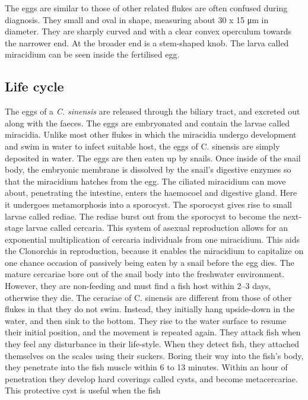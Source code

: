 \documentclass[]{book}
\theoremstyle{definition}
\theoremstyle{definition}
\theoremstyle{definition}
\theoremstyle{remark}
\begin{document}
The eggs are similar to those of other related flukes are often confused
during diagnosis. They small and oval in shape, measuring about 30 x 15
μm in diameter. They are sharply curved and with a clear convex
operculum towards the narrower end. At the broader end is a stem-shaped
knob. The larva called miracidium can be seen inside the fertilised egg.

\subsection{Life cycle}\label{life-cycle-3}

The eggs of a \emph{C. sinensis} are released through the biliary tract,
and excreted out along with the faeces. The eggs are embryonated and
contain the larvae called miracidia. Unlike most other flukes in which
the miracidia undergo development and swim in water to infect suitable
host, the eggs of C. sinensis are simply deposited in water. The eggs
are then eaten up by snails. Once inside of the snail body, the
embryonic membrane is dissolved by the snail's digestive enzymes so that
the miracidium hatches from the egg. The ciliated miracidium can move
about, penetrating the intestine, enters the haemocoel and digestive
gland. Here it undergoes metamorphosis into a sporocyst. The sporocyst
gives rise to small larvae called rediae. The rediae burst out from the
sporocyst to become the next-stage larvae called cercaria. This system
of asexual reproduction allows for an exponential multiplication of
cercaria individuals from one miracidium. This aids the Clonorchis in
reproduction, because it enables the miracidium to capitalize on one
chance occasion of passively being eaten by a snail before the egg dies.
The mature cercariae bore out of the snail body into the freshwater
environment. However, they are non-feeding and must find a fish host
within 2--3 days, otherwise they die. The ceraciae of C. sinensis are
different from those of other flukes in that they do not swim. Instead,
they initially hang upside-down in the water, and then sink to the
bottom. They rise to the water surface to resume their initial position,
and the movement is repeated again. They attack fish when they feel any
disturbance in their life-style. When they detect fish, they attached
themselves on the scales using their suckers. Boring their way into the
fish's body, they penetrate into the fish muscle within 6 to 13 minutes.
Within an hour of penetration they develop hard coverings called cysts,
and become metacercariae. This protective cyst is useful when the fish
\end{document}
